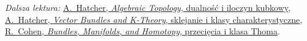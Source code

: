 \par\smallskip
{\footnotesize\noindent\emph{Dalsza lektura:}
\href{https://pi.math.cornell.edu/~hatcher/AT/AT.pdf}{A.\ Hatcher, \emph{Algebraic Topology}, dualność i iloczyn kubkowy},
\href{https://pi.math.cornell.edu/~hatcher/VBKT/VB.pdf}{A.\ Hatcher, \emph{Vector Bundles and K-Theory}, sklejanie i klasy charakterystyczne},
\href{https://math.stanford.edu/~ralph/bookR4.pdf}{R.\ Cohen, \emph{Bundles, Manifolds, and Homotopy}, przecięcia i klasa Thoma}.\par}


